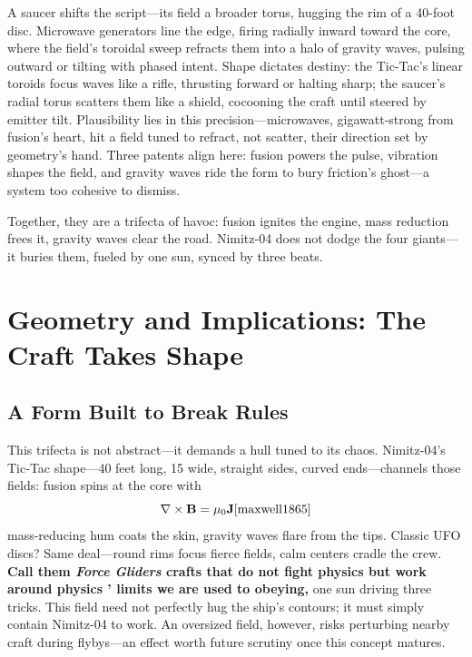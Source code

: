\documentclass[11pt]{article}
\begin{document}
	A saucer shifts the script—its field a broader torus, hugging the rim of a 40-foot disc. Microwave generators line the edge, firing radially inward toward the core, where the field’s toroidal sweep refracts them into a halo of gravity waves, pulsing outward or tilting with phased intent. Shape dictates destiny: the Tic-Tac’s linear toroids focus waves like a rifle, thrusting forward or halting sharp; the saucer’s radial torus scatters them like a shield, cocooning the craft until steered by emitter tilt. Plausibility lies in this precision—microwaves, gigawatt-strong from fusion’s heart, hit a field tuned to refract, not scatter, their direction set by geometry’s hand. Three patents align here: fusion powers the pulse, vibration shapes the field, and gravity waves ride the form to bury friction’s ghost—a system too cohesive to dismiss.
	
	Together, they are a trifecta of havoc: fusion ignites the engine, mass reduction frees it, gravity waves clear the road. Nimitz-04 does not dodge the four giants—it buries them, fueled by one sun, synced by three beats.
	
	\section{Geometry and Implications: The Craft Takes Shape}
	
	\subsection{A Form Built to Break Rules}
	This trifecta is not abstract—it demands a hull tuned to its chaos. Nimitz-04’s Tic-Tac shape—40 feet long, 15 wide, straight sides, curved ends—channels those fields: fusion spins at the core with
	\begin{equation}
		\nabla \times \mathbf{B} = \mu_0 \mathbf{J} \cite{maxwell1865}
	\end{equation}
	mass-reducing hum coats the skin, gravity waves flare from the tips. Classic UFO discs? Same deal—round rims focus fierce fields, calm centers cradle the crew. \textbf{Call them \textit{Force Gliders} crafts that do not fight physics but work around physics ' limits we are used to obeying,} one sun driving three tricks. This field need not perfectly hug the ship’s contours; it must simply contain Nimitz-04 to work. An oversized field, however, risks perturbing nearby craft during flybys—an effect worth future scrutiny once this concept matures.
	
\end{document}
